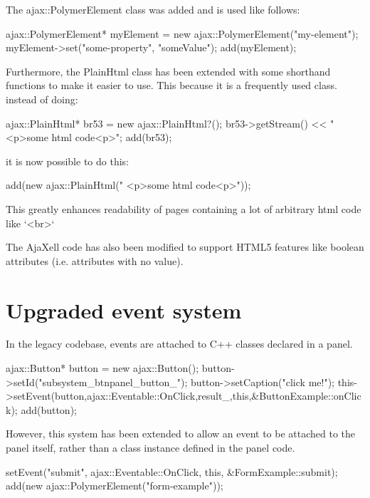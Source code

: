 The ajax::PolymerElement class was added and is used like follows:
\begin{pyglist}[language=cpp,numbers=left,numbersep=5pt,fontsize=\small]
ajax::PolymerElement* myElement = new ajax::PolymerElement("my-element");
myElement->set("some-property", "someValue");
add(myElement);
\end{pyglist}

Furthermore, the PlainHtml class has been extended with some shorthand functions
to make it easier to use. This because it is a frequently used class.
instead of doing:
\begin{pyglist}[language=cpp,numbers=left,numbersep=5pt,fontsize=\small]
ajax::PlainHtml* br53 = new ajax::PlainHtml?();
br53->getStream() << " <p>some html code<p>";
add(br53);
\end{pyglist}
it is now possible to do this:
\begin{pyglist}[language=cpp,numbers=left,numbersep=5pt,fontsize=\small]
add(new ajax::PlainHtml(" <p>some html code<p>"));
\end{pyglist}
This greatly enhances readability of pages containing a lot of arbitrary html code like `<br>`

The AjaXell code has also been modified to support HTML5 features like boolean
attributes (i.e. attributes with no value).

\section{Upgraded event system}
In the legacy codebase, events are attached to C++ classes declared in a panel.
\begin{pyglist}[language=cpp,numbers=left,numbersep=5pt,fontsize=\small]
ajax::Button* button = new ajax::Button();
button->setId("subsystem_btnpanel_button_");
button->setCaption("click me!");
this->setEvent(button,ajax::Eventable::OnClick,result_,this,&ButtonExample::onClick);
add(button);
\end{pyglist}

However, this system has been extended to allow an event to be attached to the
panel itself, rather than a class instance defined in the panel code.
\begin{pyglist}[language=cpp,numbers=left,numbersep=5pt,fontsize=\small]
setEvent("submit", ajax::Eventable::OnClick, this, &FormExample::submit);
add(new ajax::PolymerElement("form-example"));
\end{pyglist}

